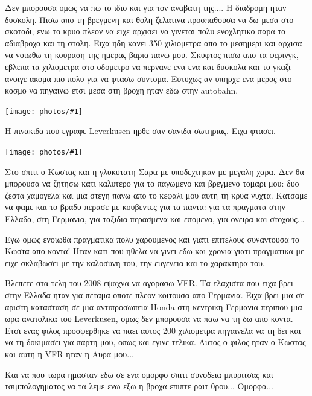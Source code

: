 \documentclass[11pt, letterpaper]{book}
\newcommand\photo[1]{\begin{center}\noindent\texttt{[image: photos/\#1]}\end{center}}
\begin{document}
Δεν μπορουσα ομως να πω το ιδιο και για τον αναβατη της.... Η διαδρομη ηταν δυσκολη. Πισω απο τη βρεγμενη και θολη ζελατινα προσπαθουσα να δω μεσα στο σκοταδι, ενω το κρυο πλεον να ειχε αρχισει να γινεται πολυ ενοχλητικο παρα τα αδιαβροχα και τη στολη. Ειχα ηδη κανει 350 χιλιομετρα απο το μεσημερι και αρχισα να νοιωθω τη κουραση της ημερας βαρια πανω μου. 
Σκυφτος πισω απο τα φερινγκ, εβλεπα τα χιλιομετρα στο οδομετρο να περνανε ενα ενα και δυσκολα και το γκαζι ανοιγε ακομα πιο πολυ για να φτασω συντομα. Ευτυχως αν υπηρχε ενα μερος στο κοσμο να πηγαινω ετσι μεσα στη βροχη ηταν εδω στην autobahn.

\photo{123.jpg}

Η πινακιδα που εγραφε Leverkusen ηρθε σαν σανιδα σωτηριας. Ειχα φτασει. 

\photo{124.jpg}

Στο σπιτι ο Κωστας και η γλυκυτατη Σαρα με υποδεχτηκαν με μεγαλη χαρα. 
Δεν θα μπορουσα να ζητησω κατι καλυτερο για το παγωμενο και βρεγμενο τομαρι μου: δυο ζεστα χαμογελα και μια στεγη πανω απο το κεφαλι μου αυτη τη κρυα νυχτα.
Κατσαμε να φαμε και το βραδυ περασε με κουβεντες για τα παντα: για τα πραγματα στην Ελλαδα, στη Γερμανια, για ταξιδια περασμενα και επομενα, για ονειρα και στοχους... 

Εγω ομως ενοιωθα πραγματικα πολυ χαρουμενος και γιατι επιτελους συναντουσα το Κωστα απο κοντα! Ηταν κατι που ηθελα να γινει εδω και χρονια γιατι πραγματικα με ειχε σκλαβωσει με την καλοσυνη του, την ευγενεια και το χαρακτηρα του. 

Βλεπετε στα τελη του 2008 εψαχνα να αγορασω VFR. Τα ελαχιστα που ειχα βρει στην Ελλαδα ηταν για πεταμα οποτε πλεον κοιτουσα απο Γερμανια. Ειχα βρει μια σε αριστη κατασταση σε μια αντιπροσωπεια Honda στη κεντρικη Γερμανια περιπου μια ωρα ανατολικα του Leverkusen, ομως δεν μπορουσα να παω να τη δω απο κοντα. 
Ετσι ενας φιλος προσφερθηκε να παει αυτος 200 χιλιομετρα πηγαινελα να τη δει και να τη δοκιμασει για παρτη μου, οπως και εγινε τελικα. 
Αυτος ο φιλος ηταν ο Κωστας και αυτη η VFR ηταν η Αυρα μου...

Και να που τωρα ημασταν εδω σε ενα ομορφο σπιτι συνοδεια μπυριτσας και τσιμπολογηματος να τα λεμε ενω εξω η βροχα επιπτε ραιτ θρου...
Ομορφα...
\end{document}
